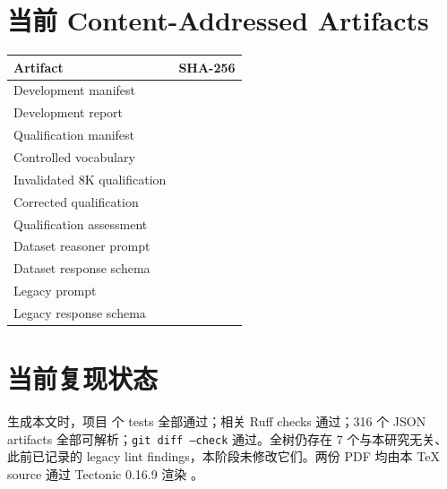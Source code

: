 \documentclass[UTF8,fontset=fandol,11pt]{ctexart}
\newcommand{\artifacthash}[1]{{\scriptsize\ttfamily\expandafter\seqsplit\expandafter{#1}}}
\begin{document}
\appendix
\section{当前 Content-Addressed Artifacts}
\label{app:artifacts-zh}

\begin{longtable}{@{}p{5.2cm}p{10.0cm}@{}}
\toprule
Artifact & SHA-256 \\
\midrule
\endhead
Development manifest & \artifacthash{\DevManifestHash} \\
Development report & \artifacthash{\DevReportHash} \\
Qualification manifest & \artifacthash{\QualManifestHash} \\
Controlled vocabulary & \artifacthash{\VocabularyHash} \\
Invalidated 8K qualification & \artifacthash{\InvalidQualHash} \\
Corrected qualification & \artifacthash{\ValidQualHash} \\
Qualification assessment & \artifacthash{\QualAssessmentHash} \\
Dataset reasoner prompt & \artifacthash{\DatasetPromptHash} \\
Dataset response schema & \artifacthash{\DatasetSchemaHash} \\
Legacy prompt & \artifacthash{\LegacyPromptHash} \\
Legacy response schema & \artifacthash{\LegacySchemaHash} \\
\bottomrule
\end{longtable}

\section{当前复现状态}

生成本文时，项目 \FullTests{} 个 tests 全部通过；相关 Ruff checks 通过；316 个 JSON artifacts 全部可解析；\texttt{git diff --check} 通过。全树仍存在 7 个与本研究无关、此前已记录的 legacy lint findings，本阶段未修改它们。两份 PDF 均由本 TeX source 通过 Tectonic 0.16.9 渲染 \cite{tectonic0169}。



\end{document}
